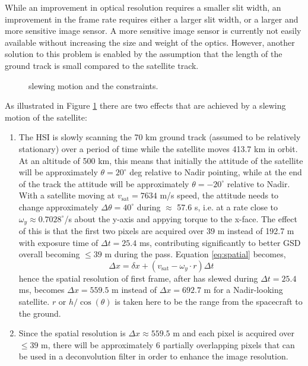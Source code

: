 While an improvement in optical resolution requires a smaller slit
width, an improvement in the frame rate requires either a larger slit
width, or a larger and more sensitive image sensor. A more sensitive
image sensor is currently not easily available without increasing the
size and weight of the optics. However, another solution to this
problem is enabled by the assumption that the length of the ground
track is small compared to the satellite track.
\begin{figure}[htbp]
  \begin{center}
    \caption{\sml slewing motion and the constraints.}
    \label{fig:con4}
\end{center}
\end{figure}
As illustrated in Figure \ref{fig:con4} there are two
effects that are achieved by a slewing motion of the satellite:
\begin{enumerate}

\item The HSI is slowly scanning the 70 km ground track (assumed to be relatively stationary) over a period
  of time while the satellite moves 413.7 km in orbit. At an altitude of
  500 km, this means that initially the attitude of the satellite will
  be approximately $\theta=20^{\circ}$ deg relative to Nadir pointing, while
  at the end of the track the attitude will be approximately $\theta=-20^{\circ}$
  relative to Nadir. With a satellite moving at $v_{\text{sat}}=7634$ m/s
  speed, the attitude needs to change approximately $\Delta \theta=40^{\circ}$ during $\approx$ 57.6 s,
  i.e. at a rate close to $\omega_{y}\approx 0.7028^{\circ}$/s about the y-axis and appying torque to the x-face. The effect of this is that the first two
  pixels are acquired over $39$ m instead of 192.7 m with exposure time of $\Delta t = 25.4$ ms, contributing
  significantly to better GSD overall becoming $\leq 39$ m during the pass. Equation \ref{eq:spatial} becomes,
\begin{equation}
\Delta x = \delta x + (v_{\text{sat}}-\omega_{y} \cdot r) \Delta t \label{eq:spatial2}
\end{equation}
hence the spatial resolution of first frame, after \sml has slewed during $\Delta t = 25.4$ ms, becomes $\Delta x=559.5 $ m instead of $\Delta x=692.7 $ m for a Nadir-looking satellite. $r$ or $h/\cos(\theta)$ is taken here to be the range from the spacecraft to the ground.

\item Since the spatial resolution is $\Delta x \approx 559.5$ m and each pixel is acquired
  over $\leq 39$ m, there will be approximately 6 partially overlapping pixels that can be
  used in a deconvolution filter in order to enhance the image
  resolution. 

\end{enumerate}
